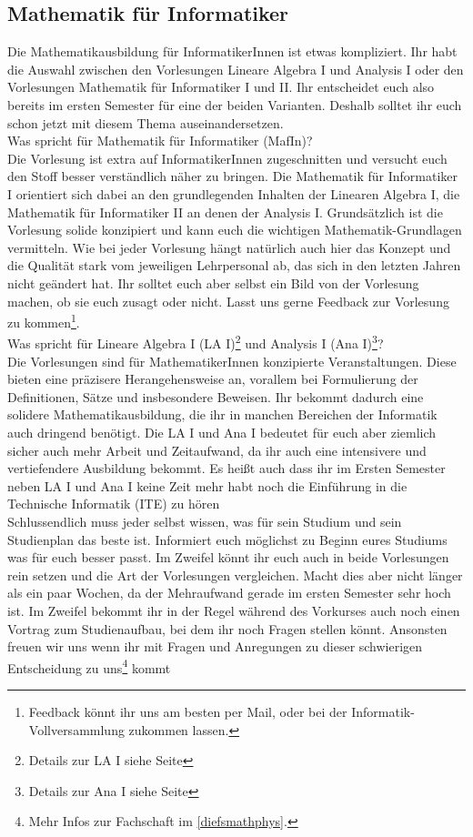 \subsection{Mathematik für Informatiker}
\label{mafin}

Die Mathematikausbildung für InformatikerInnen ist etwas kompliziert. Ihr habt die Auswahl zwischen den Vorlesungen Lineare Algebra I und Analysis I oder den Vorlesungen Mathematik für Informatiker I und II. Ihr entscheidet euch also bereits im ersten Semester für eine der beiden Varianten. Deshalb solltet ihr euch schon jetzt mit diesem Thema auseinandersetzen.\\

Was spricht für Mathematik für Informatiker (MafIn)?\\
Die Vorlesung ist extra auf InformatikerInnen zugeschnitten und versucht euch den Stoff besser verständlich näher zu bringen. Die Mathematik für Informatiker I orientiert sich dabei an den grundlegenden Inhalten der Linearen Algebra I, die Mathematik für Informatiker II an denen der Analysis I. Grundsätzlich ist die Vorlesung solide konzipiert und kann euch die wichtigen Mathematik-Grundlagen vermitteln. Wie bei jeder Vorlesung hängt natürlich auch hier das Konzept und die Qualität stark vom jeweiligen Lehrpersonal ab, das sich in den letzten Jahren nicht geändert hat. Ihr solltet euch aber selbst ein Bild von der Vorlesung machen, ob sie euch zusagt oder nicht. Lasst uns gerne Feedback zur Vorlesung zu kommen\footnote{Feedback könnt ihr uns am besten per Mail, oder bei der Informatik-Vollversammlung zukommen lassen.}.\\

Was spricht für Lineare Algebra I (LA I)\footnote{Details zur LA I siehe Seite \pageref{la1}} und Analysis I (Ana I)\footnote{Details zur Ana I siehe Seite \pageref{ana1}}?\\
Die Vorlesungen sind für MathematikerInnen konzipierte Veranstaltungen. Diese bieten eine präzisere Herangehensweise an, vorallem bei Formulierung der Definitionen, Sätze und insbesondere Beweisen. Ihr bekommt dadurch eine solidere Mathematikausbildung, die ihr in manchen Bereichen der Informatik auch dringend benötigt. Die LA I und Ana I bedeutet für euch aber ziemlich sicher auch mehr Arbeit und Zeitaufwand, da ihr auch eine intensivere und vertiefendere Ausbildung bekommt. Es heißt auch dass ihr im Ersten Semester neben LA I und Ana I keine Zeit mehr habt noch die Einführung in die Technische Informatik (ITE) zu hören\\

Schlussendlich muss jeder selbst wissen, was für sein Studium und sein Studienplan das beste ist. Informiert euch möglichst zu Beginn eures Studiums was für euch besser passt. Im Zweifel könnt ihr euch auch in beide Vorlesungen rein setzen und die Art der Vorlesungen vergleichen. Macht dies aber nicht länger als ein paar Wochen, da der Mehraufwand gerade im ersten Semester sehr hoch ist. Im Zweifel bekommt ihr in der Regel während des Vorkurses auch noch einen Vortrag zum Studienaufbau, bei dem ihr noch Fragen stellen könnt. Ansonsten freuen wir uns wenn ihr mit Fragen und Anregungen zu dieser schwierigen Entscheidung zu uns\footnote{Mehr Infos zur Fachschaft im \autoref{diefsmathphys}.} kommt
